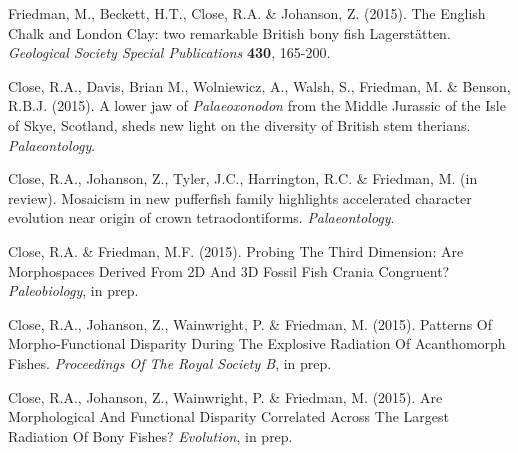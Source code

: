 \documentclass[a4paper, oneside, final]{scrartcl} %
\begin{document}
\begin{center}
\begin{flushleft}
\vspace{6pt}

Friedman, M., Beckett, H.T., Close, R.A. \& Johanson, Z. (2015). The English Chalk and London Clay: two remarkable British bony fish Lagerst\"{a}tten. \emph{Geological Society Special Publications} \textbf{430}, 165-200.

\vspace{6pt}

Close, R.A., Davis, Brian M., Wolniewicz, A., Walsh, S., Friedman, M. \& Benson, R.B.J. (2015). A lower jaw of \emph{Palaeoxonodon} from the Middle Jurassic of the Isle of Skye, Scotland, sheds new light on the diversity of British stem therians. \emph{Palaeontology}. 

\vspace{6pt}

Close, R.A., Johanson, Z., Tyler, J.C., Harrington, R.C. \& Friedman, M. (in review). Mosaicism in new pufferfish family highlights accelerated character evolution near origin of crown tetraodontiforms. \emph{Palaeontology}. 

\vspace{6pt}

Close, R.A. \& Friedman, M.F. (2015). Probing The Third Dimension: Are Morphospaces Derived From 2D And 3D Fossil Fish Crania Congruent? \emph{Paleobiology}, in prep.



\vspace{6Pt}

Close, R.A., Johanson, Z., Wainwright, P. \& Friedman, M. (2015). Patterns Of Morpho-Functional Disparity During The Explosive Radiation Of Acanthomorph Fishes. \emph{Proceedings Of The Royal Society B}, in prep.

\vspace{6Pt}

Close, R.A., Johanson, Z., Wainwright, P. \& Friedman, M. (2015). Are Morphological And Functional Disparity Correlated Across The Largest Radiation Of Bony Fishes? \emph{Evolution}, in prep.

\end{flushleft}



\end{center}
\end{document}
